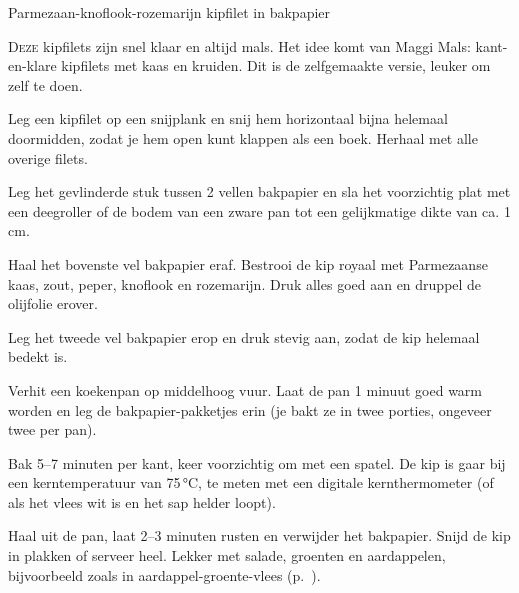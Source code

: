 \begin{recipe}{Parmezaan-knoflook-rozemarijn kipfilet in bakpapier}


\lettrine{D}{eze} kipfilets zijn snel klaar en altijd mals. Het idee komt van Maggi Mals: kant-en-klare kipfilets met kaas en kruiden. Dit is de zelfgemaakte versie, leuker om zelf te doen.

\begin{ingredients}
\end{ingredients}

\begin{steps}
  \item Leg een kipfilet op een snijplank en snij hem horizontaal bijna helemaal doormidden, zodat je hem open kunt klappen als een boek. Herhaal met alle overige filets.
  \item Leg het gevlinderde stuk tussen 2 vellen bakpapier en sla het voorzichtig plat met een deegroller of de bodem van een zware pan tot een gelijkmatige dikte van ca. 1 cm.
  \item Haal het bovenste vel bakpapier eraf. Bestrooi de kip royaal met Parmezaanse kaas, zout, peper, knoflook en rozemarijn. Druk alles goed aan en druppel de olijfolie erover.
  \item Leg het tweede vel bakpapier erop en druk stevig aan, zodat de kip helemaal bedekt is.
  \item Verhit een koekenpan op middelhoog vuur. Laat de pan 1 minuut goed warm worden en leg de bakpapier-pakketjes erin (je bakt ze in twee porties, ongeveer twee per pan).
  \item Bak 5--7 minuten per kant, keer voorzichtig om met een spatel. De kip is gaar bij een kerntemperatuur van 75\,°C, te meten met een digitale kernthermometer (of als het vlees wit is en het sap helder loopt).
  \item Haal uit de pan, laat 2--3 minuten rusten en verwijder het bakpapier. Snijd de kip in plakken of serveer heel. Lekker met salade, groenten en aardappelen, bijvoorbeeld zoals in aardappel-groente-vlees (p.~\pageref{recipe:aardappel-groente-vlees}).
\end{steps}

\end{recipe}
